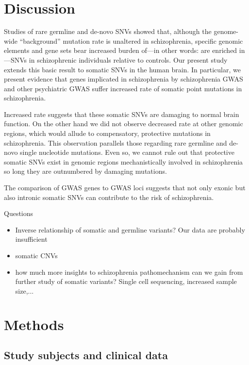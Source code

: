 \documentclass[letterpaper]{article}
\begin{document}
\section*{Discussion}

Studies of rare germline and de-novo SNVs showed that, although the
genome-wide ``background'' mutation rate is unaltered in schizophrenia,
specific genomic elements and gene sets bear increased burden of---in other
words: are enriched in---SNVs in schizophrenic individuals relative to
controls.  Our present study extends this basic result to somatic SNVs in the
human brain.  In particular, we present evidence that genes implicated in
schizophrenia by schizophrenia GWAS and other psychiatric GWAS suffer
increased rate of somatic point mutations in schizophrenia.

Increased rate suggests that these somatic SNVs are damaging to normal brain
function.  On the other hand we did not observe decreased rate at other
genomic regions, which would allude to compensatory, protective mutations in
schizophrenia.  This observation parallels those regarding rare germline and
de-novo single nucleotide mutations.  Even so, we cannot rule out that
protective somatic SNVs exist in genomic regions mechanistically involved in
schizophrenia so long they are outnumbered by damaging mutations.

The comparison of GWAS genes to GWAS loci suggests that not only 
exonic but also intronic somatic SNVs can contribute to the risk of
schizophrenia.

Questions
\begin{itemize}
	\item Inverse relationship of somatic and germline variants?  Our data
		are probably insufficient
	\item somatic CNVs
	\item how much more insights to schizophrenia pathomechanism can we
		gain from further study of somatic variants?  Single cell
		sequencing, increased sample size,...
\end{itemize}

\section*{Methods}

\subsection*{Study subjects and clinical data}
\end{document}
